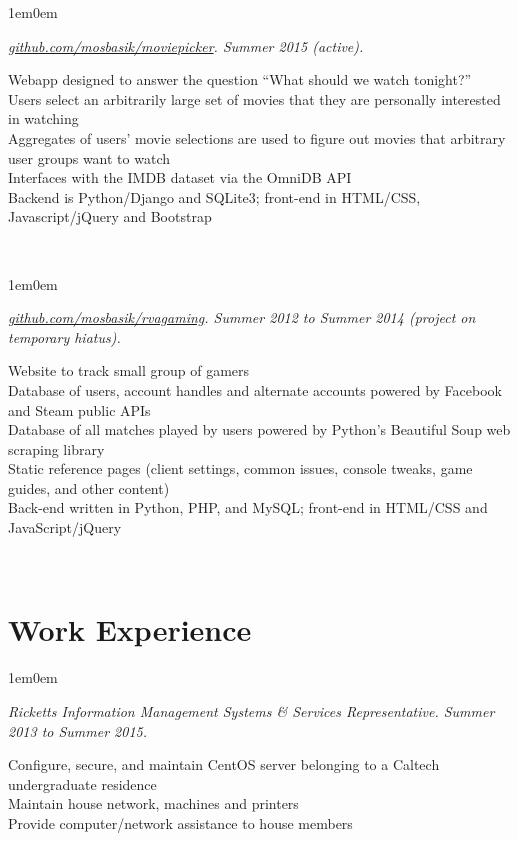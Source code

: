 \documentclass[10pt,letterpaper, full]{article}
\newcommand{\pjtitle}[1]{\renewcommand{\givenpjtitle}{#1}}
\newcommand{\pjtime}[1]{\renewcommand{\givenpjtime}{#1}}
\newcommand{\pjbody}[1]{\renewcommand{\givenpjbody}{#1}}
\newcommand{\givenpjtitle}{REQUIRED!}
\newcommand{\givenpjtime}{REQUIRED!}
\newcommand{\givenpjbody}{REQUIRED!}
\newenvironment{projectenv}
    {
        \begin{adjustwidth}{1em}{0em}
    }
    {
        \textit{\givenpjtitle. \givenpjtime.}

        \begin{minipage}[l]{\textwidth}
            \givenpjbody%
        \end{minipage}\\%


        \end{adjustwidth}
    }
\begin{document}
\begin{projectenv}
    \pjtitle{\href{https://github.com/mosbasik/moviepicker}{github.com/mosbasik/moviepicker}}
    \pjtime{Summer 2015 (active)}
    \pjbody{
        Webapp designed to answer the question “What should we watch
        tonight?”\\
        Users select an arbitrarily large set of movies that they are
        personally interested in watching\\
        Aggregates of users’ movie selections are used to figure out movies
        that arbitrary user groups want to watch\\
        Interfaces with the IMDB dataset via the OmniDB API\\
        Backend is Python/Django and SQLite3; front-end in HTML/CSS,
        Javascript/jQuery and Bootstrap\\
    }%
\end{projectenv}%

\begin{projectenv}%
    \pjtitle{\href{https://github.com/mosbasik/rvagaming}{github.com/mosbasik/rvagaming}}
    \pjtime{Summer 2012 to Summer 2014 (project on temporary hiatus)}
    \pjbody{
        Website to track small group of gamers\\
        Database of users, account handles and alternate accounts powered by
        Facebook and Steam public APIs\\
        Database of all matches played by users powered by Python’s Beautiful
        Soup web scraping library\\
        Static reference pages (client settings, common issues, console tweaks,
        game guides, and other content)\\
        Back-end written in Python, PHP, and MySQL; front-end in HTML/CSS and
        JavaScript/jQuery
    }%
\end{projectenv}%

\section{Work Experience}
\begin{projectenv}%
    \pjtitle{Ricketts Information Management Systems \& Services Representative}
    \pjtime{Summer 2013 to Summer 2015}
    \pjbody{
        Configure, secure, and maintain CentOS server belonging to a Caltech
        undergraduate residence\\
        Maintain house network, machines and printers\\
        Provide computer/network assistance to house members\\
    }
\end{projectenv}%
\end{document}
